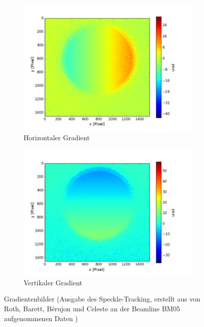 \begin{figure}[h!]
	\centering
	\begin{subfigure}[b]{0.45\textwidth}
		\centering
		\includegraphics[width=\textwidth]{img/SpeckDisH_E10001_edf_ref_start0001_1-10_edf}
		\caption[Horizontaler Gradient]{Horizontaler Gradient}
		\label{fig:hor_grad}
	\end{subfigure}
	\begin{subfigure}[b]{0.45\textwidth}
		\centering
		\includegraphics[width=\textwidth]{img/SpeckDisV_E10001_edf_ref_start0001_1-10_edf}
		\caption[Vertikaler Gradient]{Vertikaler Gradient}
		\label{fig:vert_grad}
	\end{subfigure}
	\caption[Gradient]{Gradientenbilder (Ausgabe des Speckle-Tracking, erstellt aus von Roth, Barett, Bérujon und Celeste an der Beamline BM05 aufgenommenen Daten \cite{RBB+17})}
	\label{fig:gradienten}
\end{figure}

